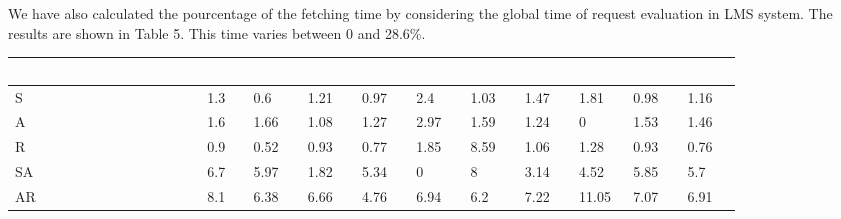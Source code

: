 We have also calculated the pourcentage of the fetching time by considering the global time of request evaluation in LMS system.
The results are shown in Table 5. This time varies between 0 and 28.6\%.

\begin{table}[h!]
\centering
\begin{tabular}{|l|l|l|l|l|l|l|l|l|l|l|}   
\hline  \rowcolor{black} \scriptsize \bf \textcolor {white}{ Requests Number (LMS)}
& \scriptsize \bf \textcolor {white}{5000}
& \scriptsize \bf \textcolor {white}{10000}
& \scriptsize \bf \textcolor  {white}{15000}
& \scriptsize \bf \textcolor  {white}{20000}
& \scriptsize \bf \textcolor  {white}{25000}
& \scriptsize \bf \textcolor  {white}{30000} 
& \scriptsize \bf \textcolor  {white}{35000}
& \scriptsize \bf \textcolor  {white}{40000}
& \scriptsize \bf \textcolor  {white}{45000}
& \scriptsize \bf \textcolor {white}{50000}\\ \hline

\scriptsize  {S }
& \scriptsize  {1.3}
& \scriptsize {0.6}
& \scriptsize {1.21}
& \scriptsize {0.97}
& \scriptsize {2.4}
& \scriptsize {1.03}
& \scriptsize {1.47}
& \scriptsize {1.81}
& \scriptsize {0.98}
& \scriptsize {1.16}
\\ \hline

\scriptsize  {A }
& \scriptsize  {1.6}
& \scriptsize {1.66}
& \scriptsize {1.08}
& \scriptsize {1.27}
& \scriptsize {2.97}
& \scriptsize {1.59}
& \scriptsize {1.24}
& \scriptsize {0}
& \scriptsize {1.53}
& \scriptsize {1.46}
\\ \hline

\scriptsize  {R}
& \scriptsize  {0.9}
& \scriptsize {0.52}
& \scriptsize {0.93}
& \scriptsize {0.77}
& \scriptsize {1.85}
& \scriptsize {8.59}
& \scriptsize {1.06}
& \scriptsize {1.28}
& \scriptsize {0.93}
& \scriptsize {0.76}
\\ \hline


\scriptsize  {SA}
& \scriptsize  {6.7}
& \scriptsize {5.97}
& \scriptsize {1.82}
& \scriptsize {5.34}
& \scriptsize {0}
& \scriptsize {8}
& \scriptsize {3.14}
& \scriptsize {4.52}
& \scriptsize {5.85}
& \scriptsize {5.7}
\\ \hline

\scriptsize  {AR}
& \scriptsize  {8.1}
& \scriptsize {6.38}
& \scriptsize {6.66}
& \scriptsize {4.76}
& \scriptsize {6.94}
& \scriptsize {6.2}
& \scriptsize {7.22}
& \scriptsize {11.05}
& \scriptsize {7.07}
& \scriptsize {6.91}
\\ \hline


\end{tabular}
\end{table}
